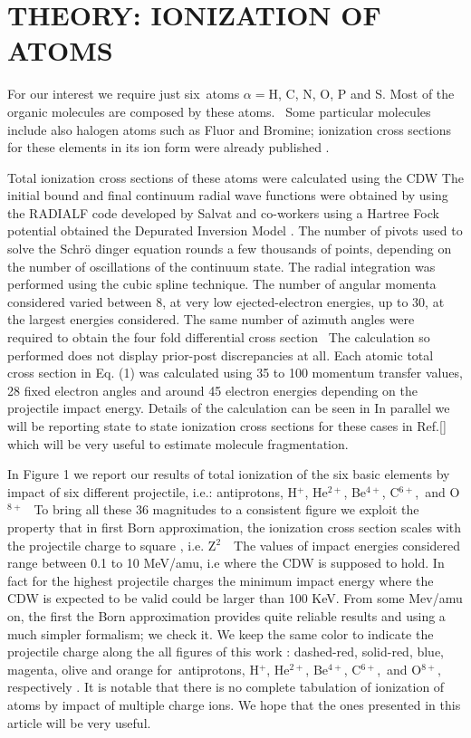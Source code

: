 \documentclass[preprint,showpacs,pra]{revtex4}
\begin{document}
\section{THEORY: IONIZATION OF ATOMS}

For our interest we require just six\ atoms $\alpha =$H, C, N, O, P and S.
Most of the organic molecules are composed by these atoms. \ Some particular
molecules include also halogen atoms such as Fluor and Bromine; ionization
cross sections for these elements in its ion form were already published 
\cite{miraglia2008,miraglia2009}.

Total ionization cross sections of these atoms were calculated using the CDW
The initial bound and final continuum radial wave functions were obtained by
using the RADIALF code developed by Salvat and co-workers using a Hartree
Fock potential obtained the Depurated Inversion Model \cite%
{mendez2016,mendez2018} . The number of pivots used to solve the Schr\"{o}%
dinger equation rounds a few thousands of points, depending on the number of
oscillations of the continuum state. The radial integration was performed
using the cubic spline technique. The number of angular momenta considered
varied between 8, at very low ejected-electron energies, up to 30, at the
largest energies considered. The same number of azimuth angles were required
to obtain the four fold differential cross section \ The calculation so
performed does not display prior-post discrepancies at all. Each atomic
total cross section in Eq. (1) was calculated using 35 to 100 momentum
transfer values, 28 fixed electron angles and around 45 electron energies
depending on the projectile impact energy. Details of the calculation can be
seen in \cite{montanari2017} In parallel we will be reporting state to state
ionization cross sections for these cases in Ref.[\cite{miraglia2019}] which
will be very useful to estimate molecule fragmentation.

In Figure 1 we report our results of total ionization of the six basic
elements by impact of six different projectile, i.e.: antiprotons, H$^{+}$,
He$^{2+}$, Be$^{4+}$, C$^{6+}$,\ and O$^{8+}$ \ To bring all these 36
magnitudes to a consistent figure we exploit the property that in first Born
approximation, the ionization cross section scales with the projectile
charge to square , i.e. Z$^{2}$\ \ The values of impact energies considered
range between 0.1 to 10 MeV/amu, i.e where the CDW is supposed to hold. In
fact for the highest projectile charges the minimum impact energy where the
CDW is expected to be valid could be larger than 100 KeV. From some Mev/amu
on, the first the Born approximation provides quite reliable results and
using a much simpler formalism; we check it. We keep the same color to
indicate the projectile charge along the all figures of this work :
dashed-red, solid-red, blue, magenta, olive and orange for\ antiprotons, H$%
^{+}$, He$^{2+}$, Be$^{4+}$, C$^{6+}$,\ and O$^{8+},$ respectively . It is
notable that there is no complete tabulation of ionization of atoms by
impact of multiple charge ions. We hope that the ones presented in this
article will be very useful.
\end{document}
